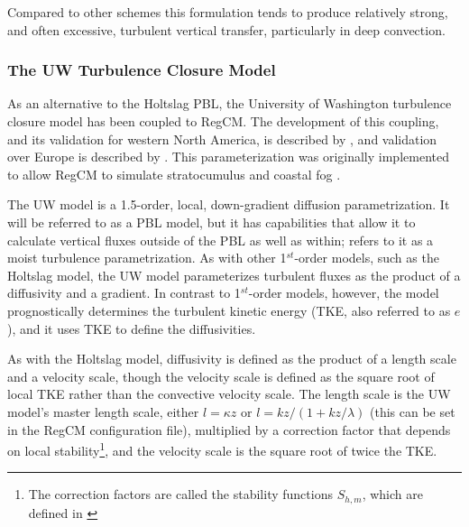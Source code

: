 Compared to other schemes this formulation tends to produce relatively strong,
and often excessive, turbulent vertical transfer, particularly in deep convection.

\subsubsection{The UW Turbulence Closure Model}

As an alternative to the Holtslag PBL, the University of Washington turbulence
closure model \citep{Grenier_01,Bretherton_04} has been coupled to RegCM.  The
development of this coupling, and its validation for western North America, is
described by \cite{OBrien_12a}, and validation over Europe is described by
\cite{Guettler_13}.  This parameterization was originally implemented to allow
RegCM to simulate stratocumulus and coastal fog
\citep{OBrien_12a,OBrien_12b}.

The UW model is a 1.5-order, local, down-gradient diffusion parametrization.
It will be referred to as a PBL model, but it has capabilities that allow it to
calculate vertical fluxes outside of the PBL as well as within;
\cite{Bretherton_04} refers to it as a moist turbulence parametrization.  As
with other 1$^{st}$-order models, such as the Holtslag model, the UW model
parameterizes turbulent fluxes as the product of a diffusivity and a gradient.
In contrast to 1$^{st}$-order models, however, the model prognostically
determines the turbulent kinetic energy (TKE, also referred to as $e$), and it
uses TKE to define the diffusivities.

As with the Holtslag model, diffusivity is defined as the product of a length
scale and a velocity scale, though the velocity scale is defined as the square
root of local TKE rather than the convective velocity scale. The length scale
is the UW model's master length scale, either $l = \kappa z$ or $l = kz/(1 +
kz/\lambda)$ (this can be set in the RegCM configuration file), multiplied by a
correction factor that depends on local stability\footnote{The correction
  factors are called the stability functions $S_{h,m}$, which are defined in
\cite{Galperin_88}}, and the velocity scale is the square root of twice the
TKE.


